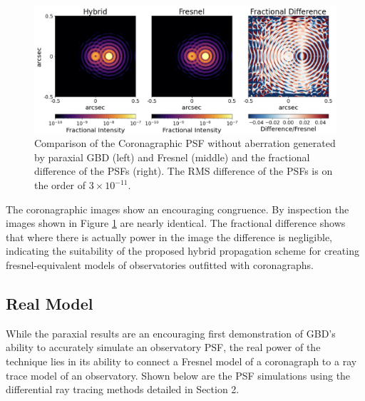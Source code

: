 \begin{figure}[H]
    \centering
    \includegraphics[width=\textwidth]{paraxial_vvc_compare.png}
    \caption{Comparison of the Coronagraphic PSF without aberration generated by paraxial GBD (left) and Fresnel (middle) and the fractional difference of the PSFs (right). The RMS difference of the PSFs is on the order of $3 \times 10^{-11}$.}
    \label{fig:paraxial_coronagraph}
\end{figure}

The coronagraphic images show an encouraging congruence. By inspection the images shown in Figure \ref{fig:paraxial_coronagraph} are nearly identical. The fractional difference shows that where there is actually power in the image the difference is negligible, indicating the suitability of the proposed hybrid propagation scheme for creating fresnel-equivalent models of observatories outfitted with coronagraphs.


\subsection{Real Model}

While the paraxial results are an encouraging first demonstration of GBD's ability to accurately simulate an observatory PSF, the real power of the technique lies in its ability to connect a Fresnel model of a coronagraph to a ray trace model of an observatory. Shown below are the PSF simulations using the differential ray tracing methods detailed in Section 2. 

